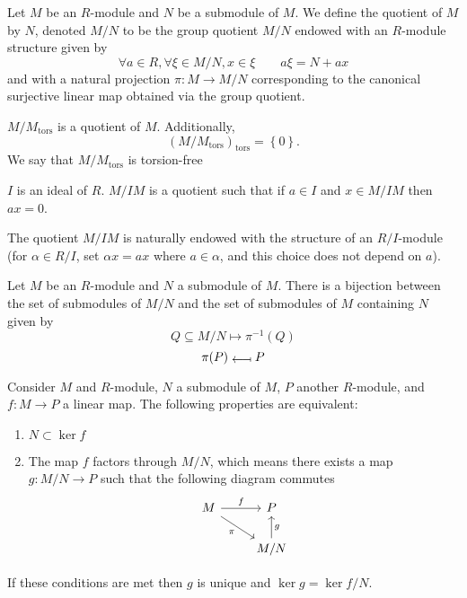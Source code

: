 \begin{dfn}
    Let $M$ be an $R$-module and $N$ be a submodule of $M$. We define the quotient of $M$ by $N$, denoted $M / N$ to be the group quotient $M / N$ endowed with an $R$-module structure given by \[\forall a\in R, \forall \xi \in  M / N, x \in  \xi \qquad a\xi=N + ax \] and with a natural projection $\pi : M \longrightarrow  M / N$ corresponding to the canonical surjective linear map obtained via the group quotient.
\end{dfn}

\begin{ex}
    $ M / M_{\text{tors}}$ is a quotient of $M$. Additionally, \[(M / M_{\text{tors}})_{\text{tors}}=\left\{ 0 \right\}. \] We say that $ M / M_{\text{tors}}$ is torsion-free
\end{ex}

\begin{ex}
$I$ is an ideal of $R$. $M / IM$ is a quotient such that if $a \in  I$ and $x \in  M / IM$ then $ax=0$.

The quotient $M / IM$ is naturally endowed with the structure of an $ R / I$-module (for $\alpha \in  R / I$, set $\alpha x = ax$ where $a \in  \alpha$, and this choice does not depend on $a$).
\end{ex}

\begin{prop}
Let $M$ be an $R$-module and $N$ a submodule of $M$. There is a bijection between the set of submodules of  $M / N$ and the set of submodules of  $M$ containing  $N$ given by \[
Q \subseteq M / N \longmapsto \pi^{-1}(Q)
\] \[
\pi(P) \; \raisebox{\depth}{\rotatebox[origin=c]{180}{$\longmapsto$}}\; P
\] 
\end{prop}

\begin{thm}
Consider $M$ and $R$-module, $N$ a submodule of $M$,  $P$ another  $R$-module, and  $f : M \longrightarrow  P$ a linear map. The following properties are equivalent: \begin{enumerate}
    \item $N \subset \ker f$
    \item The map $f$ factors through $M / N$, which means there exists a map $g : M / N \longrightarrow  P$ such that the following diagram commutes \[\begin{tikzcd}
    M & P \\
    & {M/N}
    \arrow["f", from=1-1, to=1-2]
    \arrow["g"', from=2-2, to=1-2]
    \arrow["\pi"', from=1-1, to=2-2]
\end{tikzcd}\]
\end{enumerate}
If these conditions are met then $g$ is unique and $\ker g = \ker f / N$.
\end{thm}


